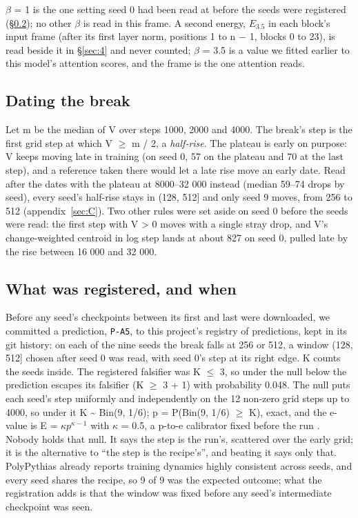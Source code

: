 \documentclass[11pt]{article}
\begin{document}
$\beta $ = 1 is the one setting seed 0 had been read at before the seeds were registered (\S\ref{sec:3.4}); no other $\beta $ is read in this frame. A second energy, $E_{3.5}$ in each block's input frame (after its first layer norm, positions 1 to n $-$ 1, blocks 0 to 23), is read beside it in \S\ref{sec:4} and never counted; $\beta $ = 3.5 is a value we fitted earlier to this model's attention scores, and the frame is the one attention reads.

\subsection{Dating the break}\label{sec:3.3}

Let m be the median of V over steps 1000, 2000 and 4000. The break's step is the first grid step at which V $\geq $ m / 2, a \emph{half-rise}. The plateau is early on purpose: V keeps moving late in training (on seed 0, 57 on the plateau and 70 at the last step), and a reference taken there would let a late rise move an early date. Read after the dates with the plateau at 8000--32 000 instead (median 59--74 drops by seed), every seed's half-rise stays in (128, 512] and only seed 9 moves, from 256 to 512 (appendix~\ref{sec:C}). Two other rules were set aside on seed 0 before the seeds were read: the first step with V > 0 moves with a single stray drop, and V's change-weighted centroid in log step lands at about 827 on seed 0, pulled late by the rise between 16 000 and 32 000.

\subsection{What was registered, and when}\label{sec:3.4}

Before any seed's checkpoints between its first and last were downloaded, we committed a prediction, \texttt{P-A5}, to this project's registry of predictions, kept in its git history: on each of the nine seeds the break falls at 256 or 512, a window (128, 512] chosen after seed 0 was read, with seed 0's step at its right edge. K counts the seeds inside. The registered falsifier was K $\leq $ 3, so under the null below the prediction escapes its falsifier (K $\geq $ 3 + 1) with probability 0.048. The null puts each seed's step uniformly and independently on the 12 non-zero grid steps up to 4000, so under it K \textasciitilde{} Bin(9, 1/6); p = P(Bin(9, 1/6) $\geq $ K), exact, and the e-value is E = $\kappa p^{\kappa -1}$ with $\kappa $ = 0.5, a p-to-e calibrator fixed before the run \citep{vovk2019}. Nobody holds that null. It says the step is the run's, scattered over the early grid; it is the alternative to ``the step is the recipe's'', and beating it says only that. PolyPythias already reports training dynamics highly consistent across seeds, and every seed shares the recipe, so 9 of 9 was the expected outcome; what the registration adds is that the window was fixed before any seed's intermediate checkpoint was seen.
\end{document}
